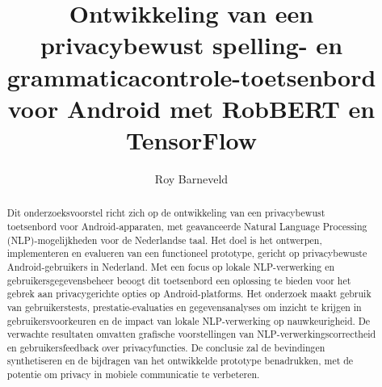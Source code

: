 \documentclass{hogent-article}
\title{Ontwikkeling van een privacybewust spelling- en grammaticacontrole-toetsenbord voor Android met RobBERT en TensorFlow}
\author{Roy Barneveld}
\begin{document}
\begin{abstract}
  Dit onderzoeksvoorstel richt zich op de ontwikkeling van een privacybewust toetsenbord voor Android-apparaten, met geavanceerde Natural Language Processing (NLP)-mogelijkheden voor de Nederlandse taal. Het doel is het ontwerpen, implementeren en evalueren van een functioneel prototype, gericht op privacybewuste Android-gebruikers in Nederland. Met een focus op lokale NLP-verwerking en gebruikersgegevensbeheer beoogt dit toetsenbord een oplossing te bieden voor het gebrek aan privacygerichte opties op Android-platforms. Het onderzoek maakt gebruik van gebruikerstests, prestatie-evaluaties en gegevensanalyses om inzicht te krijgen in gebruikersvoorkeuren en de impact van lokale NLP-verwerking op nauwkeurigheid. De verwachte resultaten omvatten grafische voorstellingen van NLP-verwerkingscorrectheid en gebruikersfeedback over privacyfuncties. De conclusie zal de bevindingen synthetiseren en de bijdragen van het ontwikkelde prototype benadrukken, met de potentie om privacy in mobiele communicatie te verbeteren.
\end{abstract}

\tableofcontents
\pagebreak



\pagebreak
\raggedright
\printbibliography[heading=bibintoc]
\end{document}
